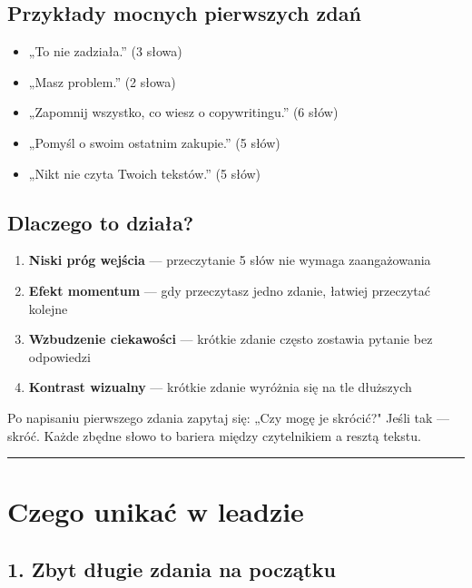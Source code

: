 \documentclass[
  12pt,
  a4paper,
  twoside,
  openright,
  12pt,
  DIV=12,
  BCOR=12mm]{scrbook}
\providecommand{\tightlist}{%
  \setlength{\itemsep}{0pt}\setlength{\parskip}{0pt}}\usepackage{longtable,booktabs,array}
\newcommand{\decoline}{%
  \begin{center}
    \textcolor{bordergray}{\rule{0.3\textwidth}{0.5pt}}
  \end{center}
}
\begin{document}
\subsection{Przykłady mocnych pierwszych
zdań}\label{przykux142ady-mocnych-pierwszych-zdaux144}

\begin{itemize}
\tightlist
\item
  „To nie zadziała.'' (3 słowa)
\item
  „Masz problem.'' (2 słowa)
\item
  „Zapomnij wszystko, co wiesz o copywritingu.'' (6 słów)
\item
  „Pomyśl o swoim ostatnim zakupie.'' (5 słów)
\item
  „Nikt nie czyta Twoich tekstów.'' (5 słów)
\end{itemize}

\subsection{Dlaczego to działa?}\label{dlaczego-to-dziaux142a}

\begin{enumerate}
\def\labelenumi{\arabic{enumi}.}
\tightlist
\item
  \textbf{Niski próg wejścia} --- przeczytanie 5 słów nie wymaga
  zaangażowania
\item
  \textbf{Efekt momentum} --- gdy przeczytasz jedno zdanie, łatwiej
  przeczytać kolejne
\item
  \textbf{Wzbudzenie ciekawości} --- krótkie zdanie często zostawia
  pytanie bez odpowiedzi
\item
  \textbf{Kontrast wizualny} --- krótkie zdanie wyróżnia się na tle
  dłuższych
\end{enumerate}

\begin{wskazowka}
Po napisaniu pierwszego zdania zapytaj się: „Czy mogę je skrócić?" Jeśli tak --- skróć. Każde zbędne słowo to bariera między czytelnikiem a resztą tekstu.
\end{wskazowka}

\decoline

\section{Czego unikać w leadzie}\label{czego-unikaux107-w-leadzie}

\subsection{1. Zbyt długie zdania na
początku}\label{zbyt-dux142ugie-zdania-na-poczux105tku}
\end{document}
